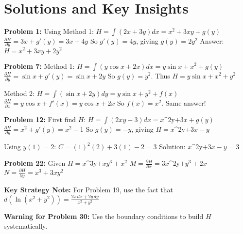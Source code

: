 \documentclass[12pt]{article}
\begin{document}
\section*{Solutions and Key Insights}

\textbf{Problem 1:} Using Method 1:
$H = \int(2x + 3y)dx = x^{2} + 3xy + g(y)$
$\frac{\partial H}{\partial y} = 3x + g'(y) = 3x + 4y$
So $g'(y) = 4y$, giving $g(y) = 2y^{2}$
Answer: $H = x^{2} + 3xy + 2y^{2}$

\textbf{Problem 7:}
Method 1: $H = \int(y\cos x + 2x)dx = y\sin x + x^{2} + g(y)$
$\frac{\partial H}{\partial y} = \sin x + g'(y) = \sin x + 2y$
So $g(y) = y^{2}$. Thus $H = y\sin x + x^{2} + y^{2}$

Method 2: $H = \int(\sin x + 2y)dy = y\sin x + y^{2} + f(x)$
$\frac{\partial H}{\partial x} = y\cos x + f'(x) = y\cos x + 2x$
So $f(x) = x^{2}$. Same answer!

\textbf{Problem 12:} First find $H$:
$H = \int(2xy + 3)dx = x$^{2y}$ + 3x + g(y)$
$\frac{\partial H}{\partial y} = x^{2} + g'(y) = x^{2} - 1$
So $g(y) = -y$, giving $H = x$^{2y}$ + 3x - y$

Using $y(1) = 2$: $C = (1)^{2}(2) + 3(1) - 2 = 3$
Solution: $x$^{2y}$ + 3x - y = 3$

\textbf{Problem 22:} Given $H = x$^{3y}$ + xy^{3} + x^{2}$
$M = \frac{\partial H}{\partial x} = 3x$^{2y}$ + y^{3} + 2x$
$N = \frac{\partial H}{\partial y} = x^{3} + 3xy^{2}$

\textbf{Key Strategy Note:} For Problem 19, use the fact that $d(\ln(x^{2} + y^{2})) = \frac{2x\,dx + 2y\,dy}{x^{2} + y^{2}}$

\textbf{Warning for Problem 30:} Use the boundary conditions to build $H$ systematically.
\end{document}
